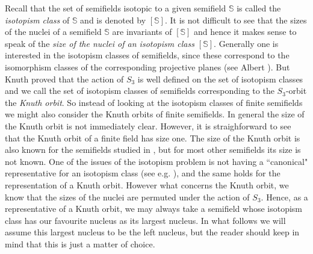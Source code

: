 \documentclass[12pt]{amsart}
\def\S{\mathbb{S}}
\begin{document}
Recall that the set of semifields isotopic to a given semifield $\S$ is called the {\it isotopism class} of $\S$ and is denoted by $[\S]$. It is not difficult to see that the sizes of the nuclei of a semifield $\S$ are invariants of $[\S]$ and hence it makes sense to speak of the {\it size of the nuclei of an isotopism class $[\S]$}. Generally one is interested in the isotopism classes of semifields, since these correspond to the isomorphism classes of the corresponding projective planes (see Albert \cite{Albert1960}). But Knuth proved that the action of $S_3$ is well defined on the set of isotopism classes and we call the set of isotopism classes of semifields corresponding to the $S_3$-orbit the {\it Knuth orbit}. So instead of looking at the isotopism classes of finite semifields we might also consider the Knuth orbits of finite semifields. In general the size of the Knuth orbit is not immediately clear. However, it is straighforward to see that the Knuth orbit of a finite field has size one. The size of the Knuth orbit is also known for the semifields studied in \cite{BallLavrauw2007}, but for most other semifields its size is not known. One of the issues of the isotopism problem is not having a ``canonical" representative for an isotopism class (see e.g. \cite{Knuth1965}), and the same holds for the representation of a Knuth orbit. However what concerns the Knuth orbit, we know that the sizes of the nuclei are permuted under the action of $S_3$.  Hence, as a representative of a Knuth orbit, we may always take a semifield whose isotopism class has our favourite nucleus as its largest nucleus. In what follows we will assume this largest nucleus to be the left nucleus, but the reader should keep in mind that this is just a matter of choice.
\end{document}
